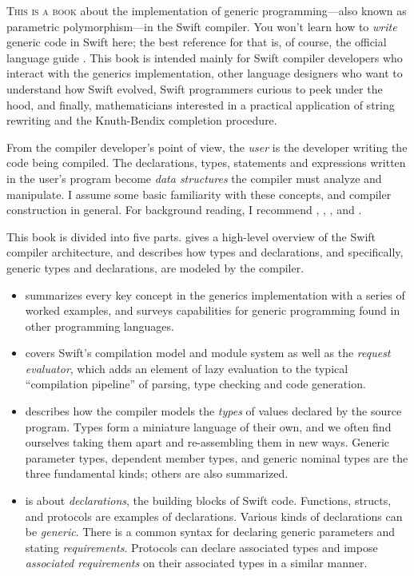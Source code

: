 \documentclass[../generics]{subfiles}
\begin{document}


\lettrine{T}{his is a book} about the implementation of generic programming---also known as parametric polymorphism---in the Swift compiler. You won't learn how to \emph{write} generic code in Swift here; the best reference for that is, of course, the official language guide \cite{tspl}. This book is intended mainly for Swift compiler developers who interact with the generics implementation, other language designers who want to understand how Swift evolved, Swift programmers curious to peek under the hood, and finally, mathematicians interested in a practical application of string rewriting and the Knuth-Bendix completion procedure.

From the compiler developer's point of view, the \emph{user} is the developer writing the code being compiled. The declarations, types, statements and expressions written in the user's program become \emph{data structures} the compiler must analyze and manipulate. I assume some basic familiarity with these concepts, and compiler construction in general. For background reading, I recommend \cite{muchnick1997advanced}, \cite{cooper2004engineering}, \cite{craftinginterpreter}, and \cite{incrementalracket}.

This book is divided into five parts.  gives a high-level overview of the Swift compiler architecture, and describes how types and declarations, and specifically, generic types and declarations, are modeled by the compiler.
\begin{itemize}
\item {} summarizes every key concept in the generics implementation with a series of worked examples, and surveys capabilities for generic programming found in other programming languages.
\item {} covers Swift's compilation model and module system as well as the \emph{request evaluator}, which adds an element of lazy evaluation to the typical ``compilation pipeline'' of parsing, type checking and code generation.
\item {} describes how the compiler models the \emph{types} of values declared by the source program. Types form a miniature language of their own, and we often find ourselves taking them apart and re-assembling them in new ways. Generic parameter types, dependent member types, and generic nominal types are the three fundamental kinds; others are also summarized.
\item {} is about \emph{declarations}, the building blocks of Swift code. Functions, structs, and protocols are examples of declarations. Various kinds of declarations can be \emph{generic}. There is a common syntax for declaring generic parameters and stating \emph{requirements}. Protocols can declare associated types and impose \emph{associated requirements} on their associated types in a similar manner.
\end{itemize}
\end{document}
